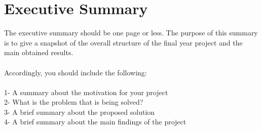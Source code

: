 
\chapter*{Executive Summary}

The executive summary should be one page or less. The purpose of this summary is to give a snapshot of the overall structure of the final year project and the main obtained results.\\ ~\\ Accordingly, you should include the following:\\ ~\\ 
1- A summary about the motivation for your project \\
2- What is the problem that is being solved? \\
3- A brief summary about the proposed solution\\
4- A brief summary about the main findings of the project 

